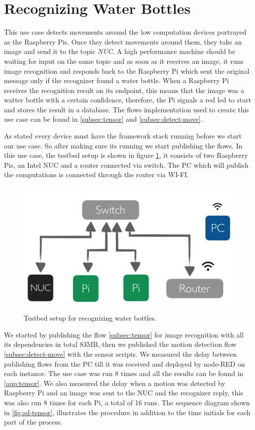 \section{Recognizing Water Bottles }
This use case detects movements around the low computation devices portrayed as the Raspberry Pis. Once they detect movements around them, they take an image and send it to the topic \textit{NUC}. A high performance machine should be waiting for input on the same topic and as soon as it receives an image, it runs image recognition and responds back to the Raspberry Pi which sent the original message  only if the recognizer found a water bottle. When a Raspberry Pi receives the recognition result on its endpoint, this means that the image was a watter bottle with a certain confidence, therefore, the Pi signals a red led to start and stores the result in a database. The flows implementation used to create this use case can be found in \ref{subsec:tensor} and \ref{subsec:detect-move}. 

\noindent As stated every device must have the framework stack running before we start our use case. So after making sure its running we start publishing the flows. In this use case, the testbed setup is shown in figure \ref{fig:tb-tensor}, it consists of two Raspberry Pis, an Intel NUC and a router connected via switch. The PC which will publish the computations is connected through the router via WI-FI. 
 \begin{figure}[H]
	\centering
	\includegraphics[scale=0.6]{images/tb-tensor.png}
	\caption{Testbed setup for recognizing water bottles.}
	\label{fig:tb-tensor}
\end{figure} 

\noindent We started by publishing the flow \ref{subsec:tensor} for  image recognition with all its dependencies in total 83MB, then we published the motion detection flow \ref{subsec:detect-move} with the sensor scripts. We measured the delay between publishing flows from the PC till it was received and deployed by node-RED on each instance. The use case was run 8 times and all the results can be found in \ref{app:tensor}. We also measured the delay when a motion was detected by Raspberry Pi and an image was sent to the NUC and the recognizer reply, this was also run 8 times for each Pi, a total of 16 runs. The sequence diagram shown in \ref{fig:sd-tensor},  illustrates the procedure in addition to the time initials for each part of the process.  \\

